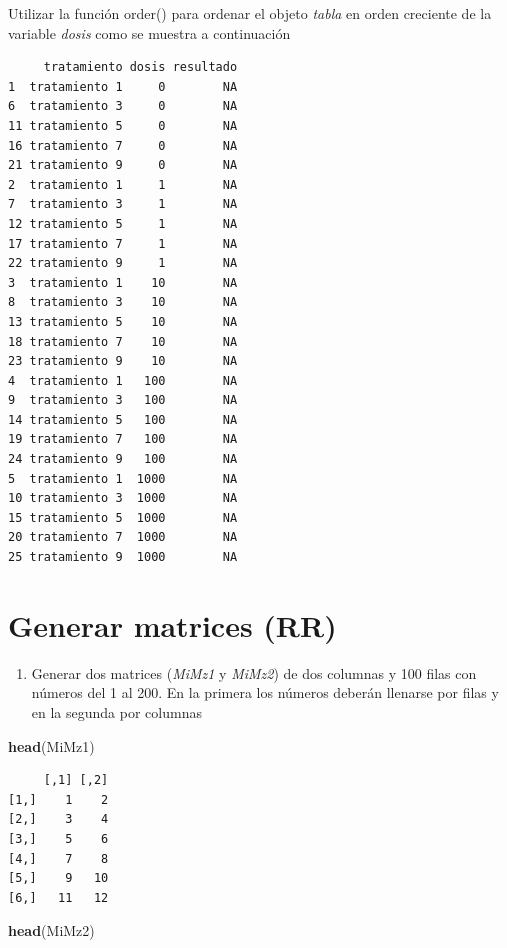 \documentclass[]{book}
\newenvironment{Shaded}{\begin{snugshade}}{\end{snugshade}}
\newcommand{\KeywordTok}[1]{\textcolor[rgb]{0.13,0.29,0.53}{\textbf{#1}}}
\newcommand{\NormalTok}[1]{#1}
\providecommand{\tightlist}{%
  \setlength{\itemsep}{0pt}\setlength{\parskip}{0pt}}
\begin{document}
Utilizar la función order() para ordenar el objeto \emph{tabla} en orden creciente de la variable \emph{dosis} como se muestra a continuación

\begin{verbatim}
     tratamiento dosis resultado
1  tratamiento 1     0        NA
6  tratamiento 3     0        NA
11 tratamiento 5     0        NA
16 tratamiento 7     0        NA
21 tratamiento 9     0        NA
2  tratamiento 1     1        NA
7  tratamiento 3     1        NA
12 tratamiento 5     1        NA
17 tratamiento 7     1        NA
22 tratamiento 9     1        NA
3  tratamiento 1    10        NA
8  tratamiento 3    10        NA
13 tratamiento 5    10        NA
18 tratamiento 7    10        NA
23 tratamiento 9    10        NA
4  tratamiento 1   100        NA
9  tratamiento 3   100        NA
14 tratamiento 5   100        NA
19 tratamiento 7   100        NA
24 tratamiento 9   100        NA
5  tratamiento 1  1000        NA
10 tratamiento 3  1000        NA
15 tratamiento 5  1000        NA
20 tratamiento 7  1000        NA
25 tratamiento 9  1000        NA
\end{verbatim}

\hypertarget{generar-matrices-rr}{%
\section{Generar matrices (RR)}\label{generar-matrices-rr}}

\begin{enumerate}
\def\labelenumi{\arabic{enumi}.}
\tightlist
\item
  Generar dos matrices (\emph{MiMz1} y \emph{MiMz2}) de dos columnas y 100 filas con números del 1 al 200. En la primera los números deberán llenarse por filas y en la segunda por columnas
\end{enumerate}

\begin{Shaded}
\begin{Highlighting}[]
\KeywordTok{head}\NormalTok{(MiMz1)}
\end{Highlighting}
\end{Shaded}

\begin{verbatim}
     [,1] [,2]
[1,]    1    2
[2,]    3    4
[3,]    5    6
[4,]    7    8
[5,]    9   10
[6,]   11   12
\end{verbatim}

\begin{Shaded}
\begin{Highlighting}[]
\KeywordTok{head}\NormalTok{(MiMz2)}
\end{Highlighting}
\end{Shaded}
\end{document}
